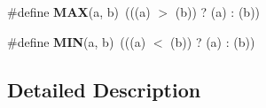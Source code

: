 \begin{DoxyCompactItemize}
\item 
\hypertarget{group___l_p_c___types___public___macros_gafa99ec4acc4ecb2dc3c2d05da15d0e3f}{\#define {\bfseries M\+A\+X}(a, b)~(((a) $>$ (b)) ? (a) \+: (b))}\label{group___l_p_c___types___public___macros_gafa99ec4acc4ecb2dc3c2d05da15d0e3f}

\item 
\hypertarget{group___l_p_c___types___public___macros_ga3acffbd305ee72dcd4593c0d8af64a4f}{\#define {\bfseries M\+I\+N}(a, b)~(((a) $<$ (b)) ? (a) \+: (b))}\label{group___l_p_c___types___public___macros_ga3acffbd305ee72dcd4593c0d8af64a4f}

\end{DoxyCompactItemize}


\subsection{Detailed Description}
